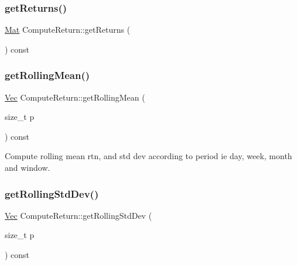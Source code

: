 \hypertarget{classComputeReturn_aa5389b3d2e175250e3569c996b5c7f00}{}\label{classComputeReturn_aa5389b3d2e175250e3569c996b5c7f00} 
\subsubsection{\texorpdfstring{get\+Returns()}{getReturns()}\hspace{0.1cm}{\footnotesize\ttfamily [2/2]}}
{\footnotesize\ttfamily \hyperlink{compute__returns__eigen_8h_ae14dd28696f743e067dbd2594616bad6}{Mat} Compute\+Return\+::get\+Returns (\begin{DoxyParamCaption}{ }\end{DoxyParamCaption}) const\hspace{0.3cm}{\ttfamily [inline]}}

\hypertarget{classComputeReturn_a9e5d3161d117ea54508c5b4847bec4c2}{}\label{classComputeReturn_a9e5d3161d117ea54508c5b4847bec4c2} 
\subsubsection{\texorpdfstring{get\+Rolling\+Mean()}{getRollingMean()}}
{\footnotesize\ttfamily \hyperlink{compute__returns__eigen_8h_a1eb6a9306ef406d7975f3cbf2e247777}{Vec} Compute\+Return\+::get\+Rolling\+Mean (\begin{DoxyParamCaption}\item[{size\+\_\+t}]{p }\end{DoxyParamCaption}) const}



Compute rolling mean rtn, and std dev according to period ie day, week, month and window. 

\hypertarget{classComputeReturn_a3da2b36268c86dd0ea45439c7a2aa6f2}{}\label{classComputeReturn_a3da2b36268c86dd0ea45439c7a2aa6f2} 
\subsubsection{\texorpdfstring{get\+Rolling\+Std\+Dev()}{getRollingStdDev()}}
{\footnotesize\ttfamily \hyperlink{compute__returns__eigen_8h_a1eb6a9306ef406d7975f3cbf2e247777}{Vec} Compute\+Return\+::get\+Rolling\+Std\+Dev (\begin{DoxyParamCaption}\item[{size\+\_\+t}]{p }\end{DoxyParamCaption}) const}



